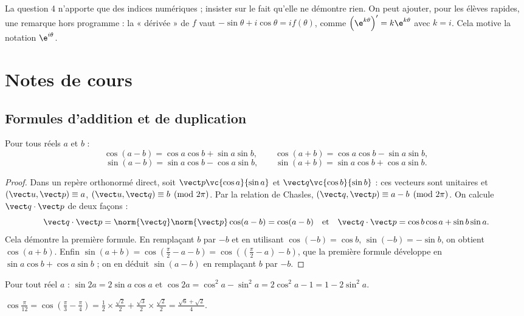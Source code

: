 \begin{teachernote}
La question 4 n'apporte que des indices numériques ; insister sur le fait qu'elle ne démontre rien. On peut ajouter, pour les élèves rapides, une remarque hors programme : la « dérivée » de $f$ vaut $-\sin\theta+i\cos\theta=if(\theta)$, comme $\left(\e^{k\theta}\right)'=k\e^{k\theta}$ avec $k=i$. Cela motive la notation $\e^{i\theta}$.
\end{teachernote}

\mxnewpage
\section{Notes de cours}
\subsection{Formules d'addition et de duplication}
\begin{theorem}
Pour tous réels $a$ et $b$ :
\[\cos(a-b)=\cos a\cos b+\sin a\sin b,\qquad\cos(a+b)=\cos a\cos b-\sin a\sin b,\]
\[\sin(a-b)=\sin a\cos b-\cos a\sin b,\qquad\sin(a+b)=\sin a\cos b+\cos a\sin b.\]
\end{theorem}
\begin{proof}
Dans un repère orthonormé direct, soit $\vect p\vc{\cos a}{\sin a}$ et $\vect q\vc{\cos b}{\sin b}$ : ces vecteurs sont unitaires et $\left(\vect u,\vect p\right)\equiv a$, $\left(\vect u,\vect q\right)\equiv b\pmod{2\pi}$. Par la relation de Chasles, $\left(\vect q,\vect p\right)\equiv a-b\pmod{2\pi}$. On calcule $\vect q\cdot\vect p$ de deux façons :
\[\vect q\cdot\vect p=\norm{\vect q}\norm{\vect p}\cos(a-b)=\cos(a-b)\quad\text{et}\quad\vect q\cdot\vect p=\cos b\cos a+\sin b\sin a.\]
Cela démontre la première formule. En remplaçant $b$ par $-b$ et en utilisant $\cos(-b)=\cos b$, $\sin(-b)=-\sin b$, on obtient $\cos(a+b)$. Enfin $\sin(a+b)=\cos\left(\frac\pi2-a-b\right)=\cos\left(\left(\frac\pi2-a\right)-b\right)$, que la première formule développe en $\sin a\cos b+\cos a\sin b$ ; on en déduit $\sin(a-b)$ en remplaçant $b$ par $-b$.
\end{proof}
\begin{theorem}
Pour tout réel $a$ : $\sin2a=2\sin a\cos a$ et $\cos2a=\cos^2a-\sin^2a=2\cos^2a-1=1-2\sin^2a$.
\end{theorem}
\begin{example}
$\cos\frac{\pi}{12}=\cos\left(\frac\pi3-\frac\pi4\right)=\frac12\times\frac{\sqrt2}2+\frac{\sqrt3}2\times\frac{\sqrt2}2=\frac{\sqrt6+\sqrt2}4$.
\end{example}

